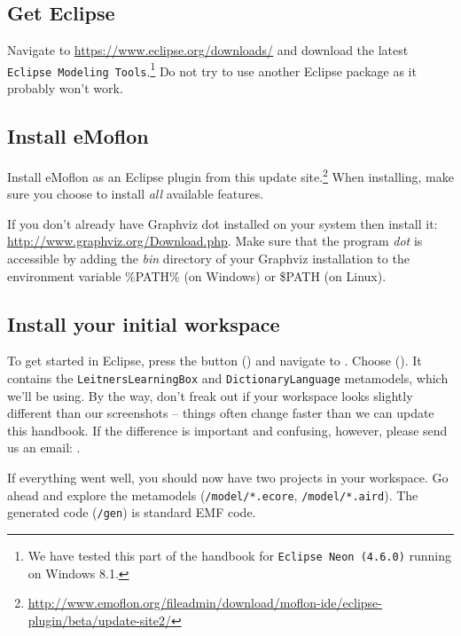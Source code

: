 
\subsection{Get Eclipse}
\label{sec:get-eclipse}

Navigate to \url{https://www.eclipse.org/downloads/} and download the latest \texttt{Eclipse Modeling Tools}.\footnote{We have tested this part of the handbook for \texttt{Eclipse Neon (4.6.0)} running on Windows 8.1.}
Do not try to use another Eclipse package as it probably won't work.

\subsection{Install eMoflon}
\label{sec:get-emoflon}

Install eMoflon as an Eclipse plugin from this update site.\footnote{\url{http://www.emoflon.org/fileadmin/download/moflon-ide/eclipse-plugin/beta/update-site2/}}
When installing, make sure you choose to install \emph{all} available features.

If you don't already have Graphviz dot installed on your system then install it:
\url{http://www.graphviz.org/Download.php}.
Make sure that the program \emph{dot} is accessible by adding the \emph{bin} directory of your Graphviz installation to the environment variable \%PATH\% (on Windows) or \$PATH (on Linux).

\subsection{Install your initial workspace}
\label{sec:loadSourceMeta}

To get started in Eclipse, press the  button (\eMoflonMenuButton) and navigate to .
Choose  ().
It contains the \texttt{Leitners\-Learning\-Box} and \texttt{Dictionary\-Language} metamodels, which we'll be using. 
By the way, don't freak out if your workspace looks slightly different than our screenshots -- things often change faster than we can update this handbook.
If the difference is important and confusing, however, please send us an email:  \emoflonMail.

If everything went well, you should now have two projects in your workspace.  
Go ahead and explore the metamodels (\texttt{/model/*.ecore}, \texttt{/model/*.aird}).
The generated code (\texttt{/gen}) is standard EMF code.

